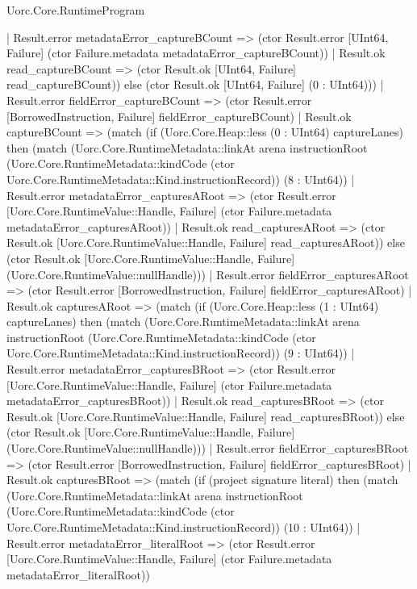 \begin{lexlean}{Uorc.Core.RuntimeProgram}
\begin{semanticmodule}
{                          | Result.error metadataError_captureBCount => (ctor Result.error [UInt64, Failure] (ctor Failure.metadata metadataError_captureBCount))
                          | Result.ok read_captureBCount => (ctor Result.ok [UInt64, Failure] read_captureBCount)) else (ctor Result.ok [UInt64, Failure] (0 : UInt64)))
                        | Result.error fieldError_captureBCount => (ctor Result.error [BorrowedInstruction, Failure] fieldError_captureBCount)
                        | Result.ok captureBCount => (match (if (Uorc.Core.Heap::less (0 : UInt64) captureLanes) then (match (Uorc.Core.RuntimeMetadata::linkAt arena instructionRoot (Uorc.Core.RuntimeMetadata::kindCode (ctor Uorc.Core.RuntimeMetadata::Kind.instructionRecord)) (8 : UInt64))
                            | Result.error metadataError_capturesARoot => (ctor Result.error [Uorc.Core.RuntimeValue::Handle, Failure] (ctor Failure.metadata metadataError_capturesARoot))
                            | Result.ok read_capturesARoot => (ctor Result.ok [Uorc.Core.RuntimeValue::Handle, Failure] read_capturesARoot)) else (ctor Result.ok [Uorc.Core.RuntimeValue::Handle, Failure] (Uorc.Core.RuntimeValue::nullHandle)))
                          | Result.error fieldError_capturesARoot => (ctor Result.error [BorrowedInstruction, Failure] fieldError_capturesARoot)
                          | Result.ok capturesARoot => (match (if (Uorc.Core.Heap::less (1 : UInt64) captureLanes) then (match (Uorc.Core.RuntimeMetadata::linkAt arena instructionRoot (Uorc.Core.RuntimeMetadata::kindCode (ctor Uorc.Core.RuntimeMetadata::Kind.instructionRecord)) (9 : UInt64))
                              | Result.error metadataError_capturesBRoot => (ctor Result.error [Uorc.Core.RuntimeValue::Handle, Failure] (ctor Failure.metadata metadataError_capturesBRoot))
                              | Result.ok read_capturesBRoot => (ctor Result.ok [Uorc.Core.RuntimeValue::Handle, Failure] read_capturesBRoot)) else (ctor Result.ok [Uorc.Core.RuntimeValue::Handle, Failure] (Uorc.Core.RuntimeValue::nullHandle)))
                            | Result.error fieldError_capturesBRoot => (ctor Result.error [BorrowedInstruction, Failure] fieldError_capturesBRoot)
                            | Result.ok capturesBRoot => (match (if (project signature literal) then (match (Uorc.Core.RuntimeMetadata::linkAt arena instructionRoot (Uorc.Core.RuntimeMetadata::kindCode (ctor Uorc.Core.RuntimeMetadata::Kind.instructionRecord)) (10 : UInt64))
                                | Result.error metadataError_literalRoot => (ctor Result.error [Uorc.Core.RuntimeValue::Handle, Failure] (ctor Failure.metadata metadataError_literalRoot))
}
\end{semanticmodule}
\end{lexlean}
